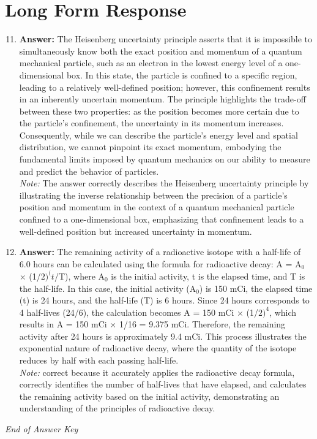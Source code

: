 \documentclass[12pt]{article}
\begin{document}
\section*{Long Form Response}
\begin{enumerate}[label=\arabic*.]
\setcounter{enumi}{10}
\item \textbf{Answer:} The Heisenberg uncertainty principle asserts that it is impossible to simultaneously know both the exact position and momentum of a quantum mechanical particle, such as an electron in the lowest energy level of a one-dimensional box. In this state, the particle is confined to a specific region, leading to a relatively well-defined position; however, this confinement results in an inherently uncertain momentum. The principle highlights the trade-off between these two properties: as the position becomes more certain due to the particle's confinement, the uncertainty in its momentum increases. Consequently, while we can describe the particle's energy level and spatial distribution, we cannot pinpoint its exact momentum, embodying the fundamental limits imposed by quantum mechanics on our ability to measure and predict the behavior of particles.
\\ \textit{Note:} The answer correctly describes the Heisenberg uncertainty principle by illustrating the inverse relationship between the precision of a particle's position and momentum in the context of a quantum mechanical particle confined to a one-dimensional box, emphasizing that confinement leads to a well-defined position but increased uncertainty in momentum.
\item \textbf{Answer:} The remaining activity of a radioactive isotope with a half-life of 6.0 hours can be calculated using the formula for radioactive decay: A = A$_{0}$ \ensuremath{\times} (1/$2)^(t$/T), where A$_{0}$ is the initial activity, t is the elapsed time, and T is the half-life. In this case, the initial activity (A$_{0}$) is 150 mCi, the elapsed time (t) is 24 hours, and the half-life (T) is 6 hours. Since 24 hours corresponds to 4 half-lives (24/6), the calculation becomes A = 150 mCi \ensuremath{\times} (1/$2)^4$, which results in A = 150 mCi \ensuremath{\times} 1/16 = 9.375 mCi. Therefore, the remaining activity after 24 hours is approximately 9.4 mCi. This process illustrates the exponential nature of radioactive decay, where the quantity of the isotope reduces by half with each passing half-life.
\\ \textit{Note:} correct because it accurately applies the radioactive decay formula, correctly identifies the number of half-lives that have elapsed, and calculates the remaining activity based on the initial activity, demonstrating an understanding of the principles of radioactive decay.
\end{enumerate}

\vfill
\noindent\textit{End of Answer Key}
\end{document}
